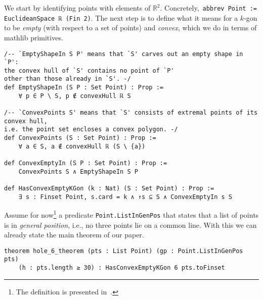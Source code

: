 We start by identifying points with elements of $\mathbb{R}^2$. Concretely,~\lstinline|abbrev Point := EuclideanSpace ℝ (Fin 2)|.
The next step is to define what it means for a $k$-gon to be \emph{empty} (with respect to a set of points) and \emph{convex}, which we do in terms of \textsf{mathlib} primitives.

\begin{lstlisting}
/-- `EmptyShapeIn S P' means that `S' carves out an empty shape in `P':
the convex hull of `S' contains no point of `P'
other than those already in `S'. -/
def EmptyShapeIn (S P : Set Point) : Prop :=
    ∀ p ∈ P \ S, p ∉ convexHull ℝ S

/-- `ConvexPoints S' means that `S' consists of extremal points of its convex hull,
i.e. the point set encloses a convex polygon. -/
def ConvexPoints (S : Set Point) : Prop :=
    ∀ a ∈ S, a ∉ convexHull ℝ (S \ {a})

def ConvexEmptyIn (S P : Set Point) : Prop :=
    ConvexPoints S ∧ EmptyShapeIn S P

def HasConvexEmptyKGon (k : Nat) (S : Set Point) : Prop :=
    ∃ s : Finset Point, s.card = k ∧ ↑s ⊆ S ∧ ConvexEmptyIn s S
\end{lstlisting}

Assume for now\footnote{The definition is presented in~.} a predicate \lstinline|Point.ListInGenPos| that states that a list of points is in \emph{general position}, i.e., no three points lie on a common line.
With this we can already state the main theorem of our paper.

\begin{lstlisting}
theorem hole_6_theorem (pts : List Point) (gp : Point.ListInGenPos pts)
    (h : pts.length ≥ 30) : HasConvexEmptyKGon 6 pts.toFinset
\end{lstlisting}

